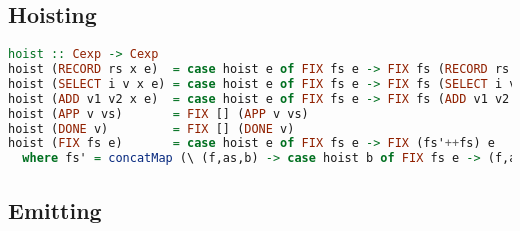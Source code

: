 \subsection{\label{subsection:hoist}Hoisting}
\begin{lstlisting}[language=Haskell]
hoist :: Cexp -> Cexp
hoist (RECORD rs x e)  = case hoist e of FIX fs e -> FIX fs (RECORD rs x e)
hoist (SELECT i v x e) = case hoist e of FIX fs e -> FIX fs (SELECT i v x e)
hoist (ADD v1 v2 x e)  = case hoist e of FIX fs e -> FIX fs (ADD v1 v2 x e)
hoist (APP v vs)       = FIX [] (APP v vs)
hoist (DONE v)         = FIX [] (DONE v)               
hoist (FIX fs e)       = case hoist e of FIX fs e -> FIX (fs'++fs) e
  where fs' = concatMap (\ (f,as,b) -> case hoist b of FIX fs e -> (f,as,e) : fs) fs
\end{lstlisting}
\subsection{\label{section:emit}Emitting}
